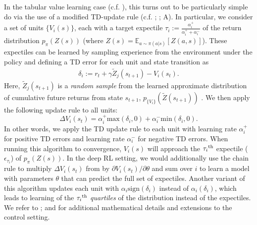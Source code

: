 In the tabular value learning case (c.f. ), this turns out to be particularly simple do via the use of a modified TD-update rule (c.f. ; \citealp{lowet2020distributional}; A).
In particular, we consider a set of units $\{ V_i(s) \}$, each with a target expectile $\tau_i := \frac{\alpha_i^+}{\alpha_i^+ + \alpha_i^-}$ of the return distribution $p_\pi(Z(s))$ (where $Z(s) = \mathbb{E}_{a \sim \pi(a|s)} \left [ Z(a, s) \right ] $).
These expectiles can be learned by sampling experience from the environment under the policy and defining a TD error for each unit and state transition as
\begin{align}
    \delta_i := r_t + \gamma \tilde{Z}_j(s_{t+1}) - V_i(s_t).
\end{align}
Here, $\tilde{Z}_j(s_{t+1})$ is a \emph{random sample} from the learned approximate distribution of cumulative future returns from state $s_{t+1}$, $p_{\{ V_i \} }(\tilde{Z}(s_{t+1}))$ \citep{lowet2020distributional,dabney2020distributional}.
We then apply the following update rule to all units:
\begin{equation}
    \label{eq:DRL_V_expec}
    \Delta V_i(s_t) = \alpha_i^+ \text{max}(\delta_i, 0 ) + \alpha_i^- \text{min}(\delta_i, 0).
\end{equation}
In other words, we apply the TD update rule to each unit with learning rate $\alpha_i^+$ for positive TD errors and learning rate $\alpha_i^-$ for negative TD errors.
When running this algorithm to convergence, $V_i(s)$ will approach the $\tau_i\textsuperscript{th}$ expectile ($\epsilon_{\tau_i}$) of $p_\pi(Z(s))$.
In the deep RL setting, we would additionally use the chain rule to multiply $\Delta V_i(s_t)$ from  by $\partial V_i(s_t) / \partial \theta$ and sum over $i$ to learn a model with parameters $\theta$ that can predict the full set of expectiles.
Another variant of this algorithm updates each unit with $\alpha_i \text{sign}(\delta_i)$ instead of $\alpha_i (\delta_i)$, which leads to learning of the $\tau_i\textsuperscript{th}$ \emph{quartiles} of the distribution instead of the expectiles.
We refer to \citet{bellemare2017distributional,dabney2018distributional,rowland2019statistics,bellemare2023distributional}; and \citet{dabney2020distributional} for additional mathematical details and extensions to the control setting.



